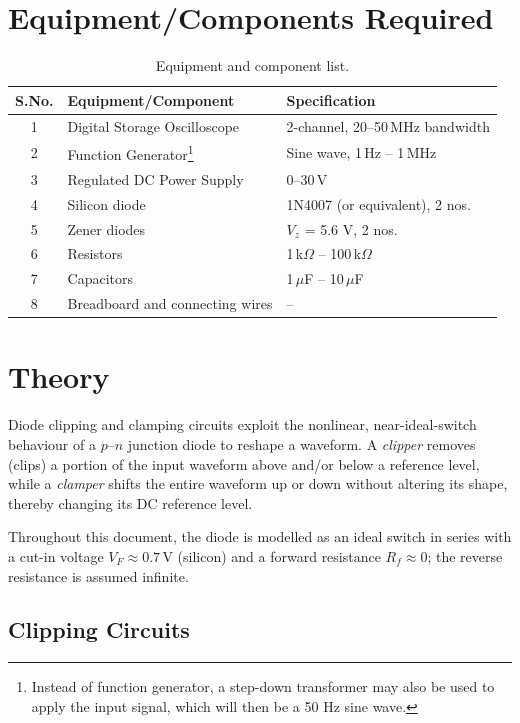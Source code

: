 \section{Equipment/Components Required}
\begin{table}[h!]
	\centering
	\begin{tabular}{@{}cll@{}}
		\toprule
		S.No. & Equipment/Component & Specification \\
		\midrule
		1 & Digital Storage Oscilloscope & 2-channel, 20--50\,MHz bandwidth \\
		2 & Function Generator\footnote{Instead of function generator, a step-down transformer may also be used to apply the input signal, which will then be a 50 Hz sine wave.} & Sine wave, 1\,Hz -- 1\,MHz \\
		3 & Regulated DC Power Supply & 0--30\,V \\
		4 & Silicon diode & 1N4007 (or equivalent), 2 nos. \\
		5 & Zener diodes & $V_z$ = 5.6 V, 2 nos. \\
		6 & Resistors & 1\,k$\Omega$ -- 100\,k$\Omega$ \\
		7 & Capacitors & 1\,$\mu$F -- 10\,$\mu$F \\
		8 & Breadboard and connecting wires & -- \\
		\bottomrule
	\end{tabular}
	\caption{Equipment and component list.}
\end{table}

\section{Theory}

Diode clipping and clamping circuits exploit the nonlinear, near-ideal-switch behaviour of a $p$--$n$ junction diode to reshape a waveform. A \emph{clipper} removes (clips) a portion of the input waveform above and/or below a reference level, while a \emph{clamper} shifts the entire waveform up or down without altering its shape, thereby changing its DC reference level.

Throughout this document, the diode is modelled as an ideal switch in series with a cut-in voltage $V_F \approx 0.7\,\text{V}$ (silicon) and a forward resistance $R_f \approx 0$; the reverse resistance is assumed infinite. 

\subsection{Clipping Circuits}


